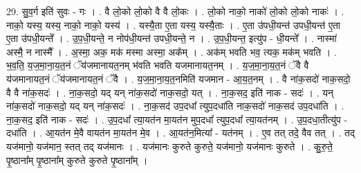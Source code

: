 \documentclass[17pt]{extarticle}
\begin{document}
29. सु॒व॒र्ग इति॑ सुवः - गः । . वै लो॒को लो॒को वै वै लो॒कः । . लो॒को नाको॒ नाको॑ लो॒को लो॒को नाकः॑ । . नाको॒ यस्य॒ यस्य॒ नाको॒ नाको॒ यस्य॑ । . यस्यै॒ता ए॒ता यस्य॒ यस्यै॒ताः । . ए॒ता उ॑पधी॒यन्त॑ उपधी॒यन्त॑ ए॒ता ए॒ता उ॑पधी॒यन्ते᳚ । . उ॒प॒धी॒यन्ते॒ न नोप॑धी॒यन्त॑ उपधी॒यन्ते॒ न । . उ॒प॒धी॒यन्त॒ इत्यु॑प - धी॒यन्ते᳚ । . नास्मा॑ अस्मै॒ न नास्मै᳚ । . अ॒स्मा॒ अक॒ मक॑ मस्मा अस्मा॒ अक᳚म् । . अक॑म् भवति भव॒ त्यक॒ मक॑म् भवति । . भ॒व॒ति॒ य॒ज॒मा॒ना॒य॒त॒नं ॅय॑जमानायत॒नम् भ॑वति भवति यजमानायत॒नम् । . य॒ज॒मा॒ना॒य॒त॒नं ॅवै वै य॑जमानायत॒नं ॅय॑जमानायत॒नं ॅवै । . य॒ज॒मा॒ना॒य॒त॒नमिति॑ यजमान - आ॒य॒त॒नम् । . वै ना॑क॒सदो॑ नाक॒सदो॒ वै वै ना॑क॒सदः॑ । . ना॒क॒सदो॒ यद् यन् ना॑क॒सदो॑ नाक॒सदो॒ यत् । . ना॒क॒सद॒ इति॑ नाक - सदः॑ । . यन् ना॑क॒सदो॑ नाक॒सदो॒ यद् यन् ना॑क॒सदः॑ । . ना॒क॒सद॑ उप॒दधा᳚ त्युप॒दधा॑ति नाक॒सदो॑ नाक॒सद॑ उप॒दधा॑ति । . ना॒क॒सद॒ इति॑ नाक - सदः॑ । . उ॒प॒दधा᳚ त्या॒यत॑न मा॒यत॑न मुप॒दधा᳚ त्युप॒दधा᳚ त्या॒यत॑नम् । . उ॒प॒दधा॒तीत्यु॑प - दधा॑ति । . आ॒यत॑न मे॒वै वायत॑न मा॒यत॑न मे॒व । . आ॒यत॑न॒मित्या᳚ - यत॑नम् । . ए॒व तत् तदे॒ वैव तत् । . तद् यज॑मानो॒ यज॑मान॒ स्तत् तद् यज॑मानः । . यज॑मानः कुरुते कुरुते॒ यज॑मानो॒ यज॑मानः कुरुते । . कु॒रु॒ते॒ पृ॒ष्ठाना᳚म् पृ॒ष्ठाना᳚म् कुरुते कुरुते पृ॒ष्ठाना᳚म् । \newline
\end{document}
